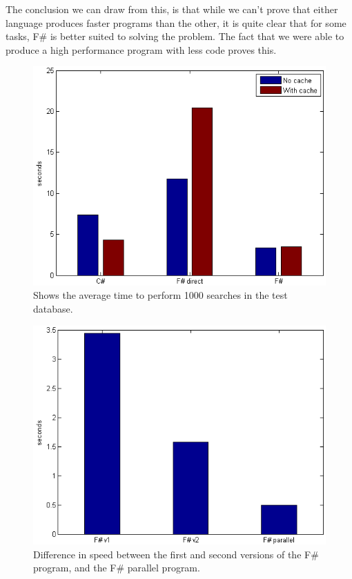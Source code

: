 \documentclass[12pt, a4paper]{article}
\begin{document}
The conclusion we can draw from this, is that while we can't prove that either language produces faster programs than the other, it is quite clear that for some tasks, F\# is better suited to solving the problem. The fact that we were able to produce a high performance program with less code proves this.

\newpage

\begin{figure}[!h]
    \includegraphics[scale=0.7]{averageChart1}
    \centering
    \caption{Shows the average time to perform 1000 searches in the test database.}
\label{fig:averageChart1}
\end{figure}

\begin{figure}[!h]
    \includegraphics[scale=0.7]{averageChart2}
    \centering
    \caption{Difference in speed between the first and second versions of the F\# program, and the F\# parallel program.}
\label{fig:averageChart2}
\end{figure}
\end{document}
